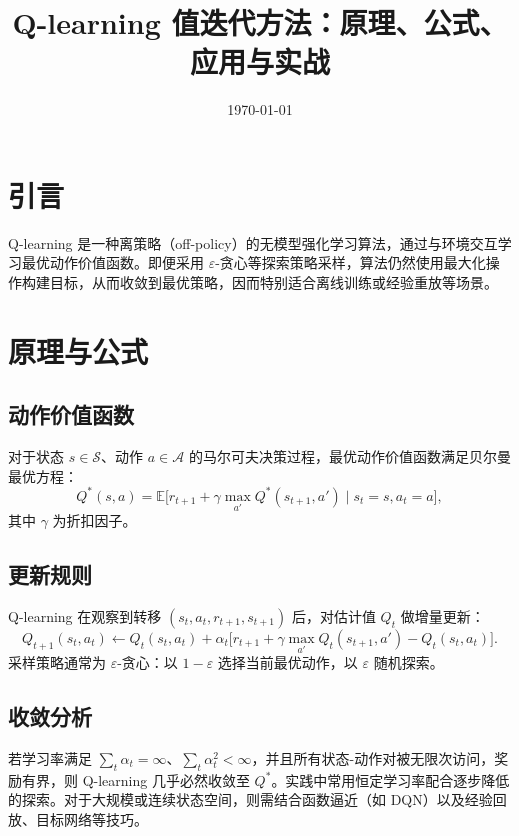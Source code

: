 \documentclass[UTF8,zihao=-4]{ctexart}
\title{Q-learning 值迭代方法：原理、公式、应用与实战}
\author{}
\date{\today}
\begin{document}
\maketitle

\section{引言}
Q-learning 是一种离策略（off-policy）的无模型强化学习算法，通过与环境交互学习最优动作价值函数。即便采用 \(\varepsilon\)-贪心等探索策略采样，算法仍然使用最大化操作构建目标，从而收敛到最优策略，因而特别适合离线训练或经验重放等场景。

\section{原理与公式}
\subsection{动作价值函数}
对于状态 \(s \in \mathcal{S}\)、动作 \(a \in \mathcal{A}\) 的马尔可夫决策过程，最优动作价值函数满足贝尔曼最优方程：
\begin{equation}
Q^*(s,a) = \mathbb{E}\big[ r_{t+1} + \gamma \max_{a'} Q^*(s_{t+1}, a') \mid s_t = s, a_t = a \big],
\end{equation}
其中 \(\gamma\) 为折扣因子。

\subsection{更新规则}
Q-learning 在观察到转移 \((s_t, a_t, r_{t+1}, s_{t+1})\) 后，对估计值 \(Q_t\) 做增量更新：
\begin{equation}
Q_{t+1}(s_t, a_t) \leftarrow Q_t(s_t, a_t) + \alpha_t \Big[ r_{t+1} + \gamma \max_{a'} Q_t(s_{t+1}, a') - Q_t(s_t, a_t) \Big].
\end{equation}
采样策略通常为 \(\varepsilon\)-贪心：以 \(1-\varepsilon\) 选择当前最优动作，以 \(\varepsilon\) 随机探索。

\subsection{收敛分析}
若学习率满足 \(\sum_t \alpha_t = \infty\)、\(\sum_t \alpha_t^2 < \infty\)，并且所有状态-动作对被无限次访问，奖励有界，则 Q-learning 几乎必然收敛至 \(Q^*\)。实践中常用恒定学习率配合逐步降低的探索。对于大规模或连续状态空间，则需结合函数逼近（如 DQN）以及经验回放、目标网络等技巧。
\end{document}
